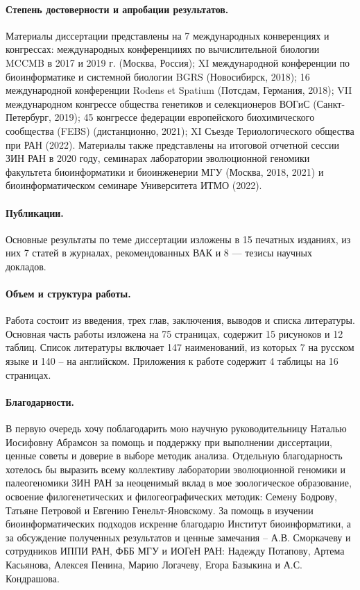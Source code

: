 \paragraph{Степень достоверности и апробации результатов.} Материалы диссертации представлены на 7 международных конверенциях и конгрессах: международных конференцииях по вычислительной биологии MCCMB в 2017 и 2019 г. (Москва, Россия); XI международной конференции по биоинформатике и системной биологии BGRS (Новосибирск, 2018); 16 международной конференции Rodens et Spatium (Потсдам, Германия, 2018); VII международном конгрессе общества генетиков и селекционеров ВОГиС (Санкт-Петербург, 2019); 45 конгрессе федерации европейского биохимического сообщества (FEBS) (дистанционно, 2021); XI Съезде Териологического общества при РАН (2022). Материалы также представлены на итоговой отчетной сессии ЗИН РАН в 2020 году, семинарах лаборатории эволюционной геномики факультета биоинформатики и биоинженерии МГУ (Москва, 2018, 2021) и биоинформатическом семинаре Университета ИТМО (2022).

\paragraph{Публикации.} Основные результаты по теме диссертации изложены в 15 печатных изданиях, из них 7 статей в журналах, рекомендованных ВАК и 8 --- тезисы научных докладов.

\paragraph{Объем и структура работы.} Работа состоит из введения, трех глав, заключения, выводов и списка литературы. Основная часть работы изложена на 75 страницах, содержит 15 рисуноков и 12 таблиц. Список литературы включает 147 наименований, из которых 7 на русском языке и 140 -- на английском. Приложения к работе содержит 4 таблицы на 16 страницах.

\paragraph{Благодарности.}
В первую очередь хочу поблагодарить мою научную руководительницу Наталью Иосифовну Абрамсон за помощь и поддержку при выполнении диссертации, ценные советы и доверие в выборе методик анализа. Отдельную благодарность хотелось бы выразить всему коллективу лаборатории эволюционной геномики и палеогеномики ЗИН РАН за неоценимый вклад в мое зоологическое образование, освоение филогенетических и филогеографических методик: Семену Бодрову, Татьяне Петровой и Евгению Генельт-Яновскому. За помощь в изучении биоинформатических подходов искренне благодарю Институт биоинформатики, а за обсуждение полученных результатов и ценные замечания -- А.В. Сморкачеву и сотрудников ИППИ РАН, ФББ МГУ и ИОГеН РАН: Надежду Потапову, Артема Касьянова, Алексея Пенина, Марию Логачеву, Егора Базыкина и А.С. Кондрашова.   

